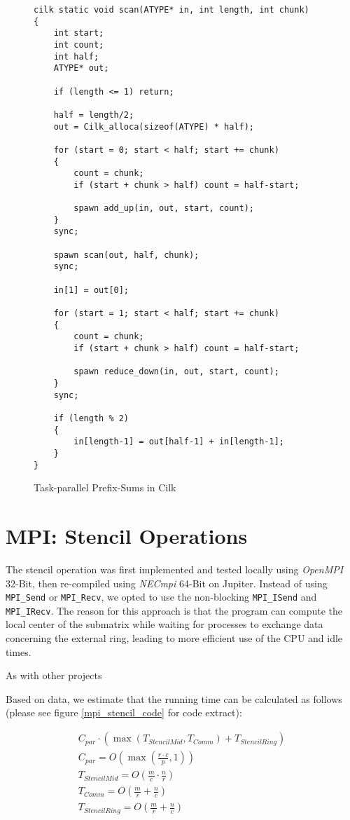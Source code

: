 \documentclass[11pt]{article}
\begin{document}
\begin{figure}
\label{cilk_prefix_code}
\caption{Task-parallel Prefix-Sums in Cilk}
\begin{lstlisting}
cilk static void scan(ATYPE* in, int length, int chunk)
{
	int start;
	int count;
	int half;
	ATYPE* out;

	if (length <= 1) return;

	half = length/2;
	out = Cilk_alloca(sizeof(ATYPE) * half);

	for (start = 0; start < half; start += chunk) 
	{
		count = chunk;
		if (start + chunk > half) count = half-start;

		spawn add_up(in, out, start, count);
	}
	sync;

	spawn scan(out, half, chunk);
	sync;

	in[1] = out[0];

	for (start = 1; start < half; start += chunk) 
	{
		count = chunk;
		if (start + chunk > half) count = half-start;

		spawn reduce_down(in, out, start, count);
	}
	sync;

	if (length % 2)
	{
		in[length-1] = out[half-1] + in[length-1];
	}
}
\end{lstlisting}

\end{figure}



\section{MPI: Stencil Operations}
The stencil operation was first implemented and tested locally using \emph{OpenMPI} 32-Bit, then re-compiled using \emph{NECmpi} 64-Bit on Jupiter. Instead of using \verb=MPI_Send= or \verb=MPI_Recv=, we opted to use the non-blocking \verb=MPI_ISend= and \verb=MPI_IRecv=. The reason for this approach is that the program can compute the local center of the submatrix while waiting for processes to exchange data concerning the external ring, leading to more efficient use of the CPU and idle times.

As with other projects

Based on data, we estimate that the running time can be calculated as follows (please see figure \ref{mpi_stencil_code} for code extract):

\begin{eqnarray}
C_{par} \cdot \left( \max(T_{StencilMid}, T_{Comm}) + T_{StencilRing} \right)\\
C_{par} = O\left(\max(\frac{r\cdot c}{p}, 1)\right)\\
T_{StencilMid} = O\left(\frac{m}{c} \cdot \frac{n}{r}\right)\\
T_{Comm} = O\left(\frac{m}{r} + \frac{n}{c}\right)\\
T_{StencilRing} = O\left(\frac{m}{r} + \frac{n}{c}\right)
\end{eqnarray}
\end{document}
